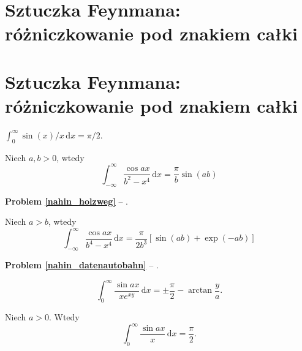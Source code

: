 %

\section{Sztuczka Feynmana: różniczkowanie pod znakiem całki}
\section{Sztuczka Feynmana: różniczkowanie pod znakiem całki}

\begin{problem}
    $\int_0^\infty \sin(x) / x \,\mathrm{d}x = \pi/2$.
\end{problem}


\begin{problem_with_solution}
    \label{nahin_holzweg}%
    Niech $a, b > 0$, wtedy
    \begin{equation}
        \int_{-\infty}^\infty \frac{\cos ax}{b^2 - x^4} \,\mathrm{d} x = \frac{\pi}{b} \sin (ab)
    \end{equation}
\end{problem_with_solution}

\textbf{Problem \ref{nahin_holzweg}} -- \cite[s. 115, 375, 376]{nahin15}.

\begin{problem}
    \label{nahin_datenautobahn}%
    Niech $a > b$, wtedy
    \begin{equation}
        \int_{-\infty}^\infty \frac{\cos ax}{b^4 - x^4} \,\mathrm{d} x = \frac{\pi}{2b^3} [\sin (ab) + \exp (-ab)]
    \end{equation}
\end{problem}

\textbf{Problem \ref{nahin_datenautobahn}} -- \cite[s. 115, 376]{nahin15}.

\begin{problem}
    \begin{equation}
        \int_0^\infty \frac{\sin ax}{x e^{xy}} \,\mathrm{d}x = \pm \frac \pi 2 - \arctan \frac y a.
    \end{equation}
\end{problem}

\begin{problem}
    Niech $a > 0$.
    Wtedy
    \begin{equation}
        \int_0^\infty \frac{\sin ax}{x} \,\mathrm{d}x = \frac \pi 2.
    \end{equation}
\end{problem}





